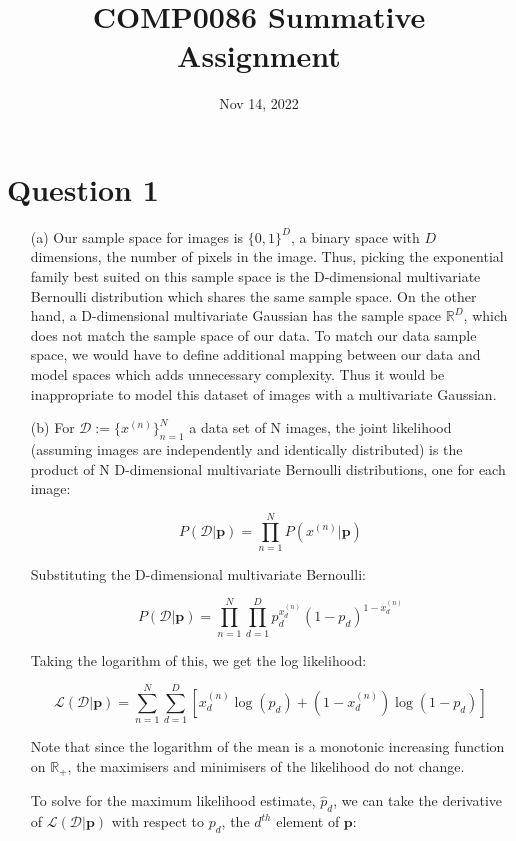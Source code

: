 \documentclass[12pt]{article}
\title{\textbf{COMP0086 Summative Assignment}}
\date{Nov 14, 2022}
\begin{document}
\maketitle
\section*{Question 1}


\begin{enumerate}

\item[(a)] Our sample space for images is $\{0, 1\}^D$, a binary space with $D$ dimensions, the number of pixels in the image.
Thus, picking the exponential family best suited on this sample space is the D-dimensional multivariate Bernoulli distribution which shares the same sample space.
On the other hand, a D-dimensional multivariate Gaussian has the sample space $\mathbb{R}^D$, which does not match the sample space of our data.
To match our data sample space, we would have to define additional mapping between our data and model spaces which adds unnecessary complexity.
Thus it would be inappropriate to model this dataset of images with a multivariate Gaussian.

\item[(b)] For $\mathcal{D} := \{x^{(n)}\}_{n=1}^N$ a data set of N images, the joint likelihood (assuming images are independently and identically distributed) is the product of N D-dimensional multivariate Bernoulli distributions, one for each image:

$$P(\mathcal{D}|\textbf{p}) = \prod_{n=1}^N P(x^{(n)} | \textbf{p})$$


Substituting the D-dimensional multivariate Bernoulli:

$$P(\mathcal{D}|\textbf{p}) = \prod_{n=1}^{N}\prod_{d=1}^{D} p_d^{x_d^{(n)}} (1-p_d)^{1-x_d^{(n)}}$$

Taking the logarithm of this, we get the log likelihood:

$$\mathcal{L}(\mathcal{D}|\textbf{p}) = \sum_{n=1}^{N}\sum_{d=1}^{D} [x_d^{(n)}\log(p_d) +  (1-x_d^{(n)})\log(1-p_d)]$$

Note that since the logarithm of the mean is a monotonic increasing function on $\mathbb{R}_+$, the maximisers and minimisers of the likelihood do not change.

To solve for the maximum likelihood estimate, $\hat p_d$, we can take the derivative of $\mathcal{L}(\mathcal{D}|\textbf{p})$ with respect to $p_d$, the $d^{th}$ element of $\textbf{p}$:


\end{enumerate}
\end{document}

